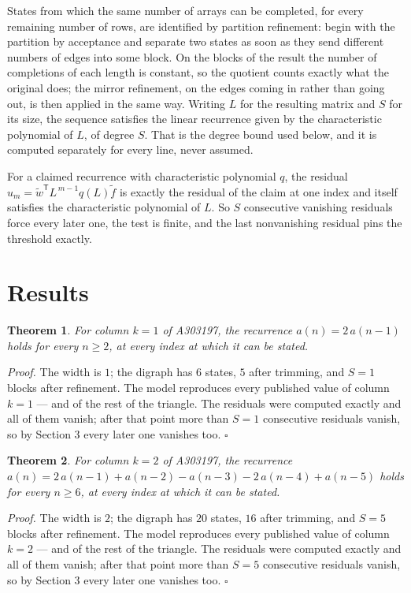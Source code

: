 \documentclass[11pt]{article}
\newtheorem{theorem}{Theorem}
\theoremstyle{definition}
\begin{document}
States from which the same number of arrays can be completed, for every remaining number of rows, are identified by partition refinement: begin with the partition by acceptance and separate two states as soon as they send different numbers of edges into some block. On the blocks of the result the number of completions of each length is constant, so the quotient counts exactly what the original does; the mirror refinement, on the edges coming in rather than going out, is then applied in the same way. Writing $L$ for the resulting matrix and $S$ for its size, the sequence satisfies the linear recurrence given by the characteristic polynomial of $L$, of degree $S$. That is the degree bound used below, and it is computed separately for every line, never assumed.

For a claimed recurrence with characteristic polynomial $q$, the residual $u_m = \tilde w^{\mathsf T}L^{\,m-1}q(L)\tilde f$ is exactly the residual of the claim at one index and itself satisfies the characteristic polynomial of $L$. So $S$ consecutive vanishing residuals force every later one, the test is finite, and the last nonvanishing residual pins the threshold exactly.

\section{Results}

\begin{theorem} For column $k = 1$ of A303197, the recurrence $a(n) = 2\,a(n-1)$ holds for every $n \ge 2$, at every index at which it can be stated.\end{theorem}

{\itshape Proof.} The width is $1$; the digraph has $6$ states, $5$ after trimming, and $S = 1$ blocks after refinement. The model reproduces every published value of column $k = 1$ --- and of the rest of the triangle. The residuals were computed exactly and all of them vanish; after that point more than $S = 1$ consecutive residuals vanish, so by Section 3 every later one vanishes too. $\square$

\begin{theorem} For column $k = 2$ of A303197, the recurrence $a(n) = 2\,a(n-1) + a(n-2) - a(n-3) - 2\,a(n-4) + a(n-5)$ holds for every $n \ge 6$, at every index at which it can be stated.\end{theorem}

{\itshape Proof.} The width is $2$; the digraph has $20$ states, $16$ after trimming, and $S = 5$ blocks after refinement. The model reproduces every published value of column $k = 2$ --- and of the rest of the triangle. The residuals were computed exactly and all of them vanish; after that point more than $S = 5$ consecutive residuals vanish, so by Section 3 every later one vanishes too. $\square$
\end{document}

